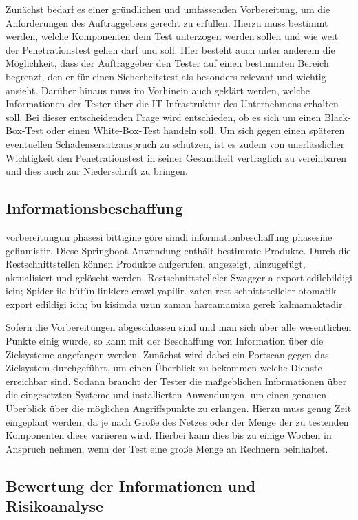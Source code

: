 Zunächst bedarf es einer gründlichen und umfassenden Vorbereitung, um die Anforderungen des Auftraggebers gerecht zu erfüllen. Hierzu muss bestimmt werden, welche Komponenten dem Test unterzogen werden sollen und wie weit der Penetrationstest gehen darf und soll. Hier besteht auch unter anderem die Möglichkeit, dass der Auftraggeber den Tester auf einen bestimmten Bereich begrenzt, den er für einen Sicherheitstest als besonders relevant und wichtig ansieht. Darüber hinaus muss im Vorhinein auch geklärt werden, welche Informationen der Tester über die IT-Infrastruktur des Unternehmens erhalten soll. Bei dieser entscheidenden Frage wird entschieden, ob es sich um einen Black-Box-Test oder einen White-Box-Test handeln soll. Um sich gegen einen späteren eventuellen Schadensersatzanspruch zu schützen, ist es zudem von unerlässlicher Wichtigkeit den Penetrationstest in seiner Gesamtheit vertraglich zu vereinbaren und dies auch zur Niederschrift zu bringen.

\subsection{Informationsbeschaffung}

vorbereitungun phasesi bittigine göre simdi informationbeschaffung phasesine gelinmistir.
Diese Springboot Anwendung enthält bestimmte Produkte. Durch die Restschnittstellen können Produkte aufgerufen, angezeigt, hinzugefügt, aktualisiert und gelöscht werden. Restschnittstelleler Swagger a export edilebildigi icin; Spider ile bütün linklere crawl yapilir. zaten rest schnittstelleler otomatik export edildigi icin; bu kisimda uzun zaman harcamamiza gerek kalmamaktadir.

Sofern die Vorbereitungen abgeschlossen sind und man sich über alle wesentlichen Punkte einig wurde, so kann mit der Beschaffung von Information über die Zielsysteme angefangen werden. Zunächst wird dabei ein Portscan gegen das Zielsystem durchgeführt, um einen Überblick zu bekommen welche Dienste erreichbar sind. Sodann braucht der Tester die maßgeblichen  Informationen über die eingesetzten Systeme und installierten Anwendungen, um einen genauen Überblick über die möglichen Angriffspunkte zu erlangen. Hierzu muss genug Zeit eingeplant werden, da je nach Größe des Netzes oder der Menge der zu testenden Komponenten diese variieren wird. Hierbei kann dies bis zu einige Wochen in Anspruch nehmen, wenn der Test eine große Menge an Rechnern beinhaltet.

\subsection{Bewertung der Informationen und Risikoanalyse}


